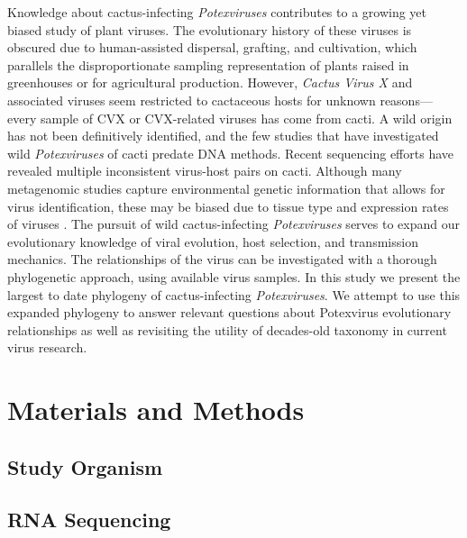 \documentclass[11pt,letterpaper,titlepage]{article}
\begin{document}
\begin{linenumbers}
Knowledge about cactus-infecting \textit{Potexviruses} contributes to a growing yet biased study of plant viruses. 
The evolutionary history of these viruses is obscured due to human-assisted dispersal, grafting, and cultivation, which parallels the disproportionate sampling representation of plants raised in greenhouses or for agricultural production. 
However, \textit{Cactus Virus X} and associated viruses seem restricted to cactaceous hosts for unknown reasons---every sample of CVX or CVX-related viruses has come from cacti.
A wild origin has not been definitively identified, and the few studies that have investigated wild \textit{Potexviruses} of cacti predate DNA methods.
Recent sequencing efforts have revealed multiple inconsistent virus-host pairs on cacti. 
Although many metagenomic studies capture environmental genetic information that allows for virus identification, these may be biased due to tissue type and expression rates of viruses \citep{lacroix2016methodological}.
The pursuit of wild cactus-infecting \textit{Potexviruses} serves to expand our evolutionary knowledge of viral evolution, host selection, and transmission mechanics. 
The relationships of the virus can be investigated with a thorough phylogenetic approach, using available virus samples. 
In this study we present the largest to date phylogeny of cactus-infecting \textit{Potexviruses}.
We attempt to use this expanded phylogeny to answer relevant questions about Potexvirus evolutionary relationships as well as revisiting the utility of decades-old taxonomy in current virus research. 


\section*{Materials and Methods}

\subsection*{Study Organism}


\subsection*{RNA Sequencing}


\end{linenumbers}
\end{document}
